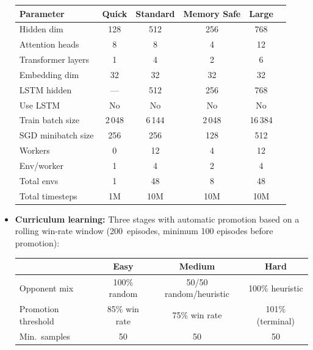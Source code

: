 \documentclass[11pt, a4paper]{article}
\begin{document}
\begin{itemize}
        \begin{center}
        \small
        \begin{tabularx}{\textwidth}{l c c c c c}
            \toprule
            \textbf{Parameter} & \textbf{Quick} & \textbf{Standard} & \textbf{Memory Safe} & \textbf{Large} \\
            \midrule
            Hidden dim              & 128   & 512   & 256   & 768   \\
            Attention heads         & 8     & 8     & 4     & 12    \\
            Transformer layers      & 1     & 4     & 2     & 6     \\
            Embedding dim           & 32    & 32    & 32    & 32    \\
            LSTM hidden             & ---   & 512   & 256   & 768   \\
            Use LSTM                & No    & No    & No    & No    \\
            Train batch size        & 2\,048 & 6\,144 & 2\,048 & 16\,384 \\
            SGD minibatch size      & 256   & 256   & 128   & 512   \\
            Workers                 & 0     & 12    & 4     & 12    \\
            Env/worker              & 1     & 4     & 2     & 4     \\
            Total envs              & 1     & 48    & 8     & 48    \\
            Total timesteps         & 1M    & 10M   & 10M   & 10M   \\
            \bottomrule
        \end{tabularx}
        \end{center}

    \item \textbf{Curriculum learning:}
        Three stages with automatic promotion based on a rolling win-rate window (200~episodes, minimum 100 episodes before promotion):

        \begin{center}
        \small
        \begin{tabularx}{0.9\textwidth}{l c c c}
            \toprule
            & \textbf{Easy} & \textbf{Medium} & \textbf{Hard} \\
            \midrule
            Opponent mix           & 100\% random & 50/50 random/heuristic & 100\% heuristic \\
            Promotion threshold    & 85\% win rate & 75\% win rate & 101\% (terminal) \\
            Min.\ samples          & 50 & 50 & 50 \\
            \bottomrule
        \end{tabularx}
        \end{center}


\end{itemize}
\end{document}
